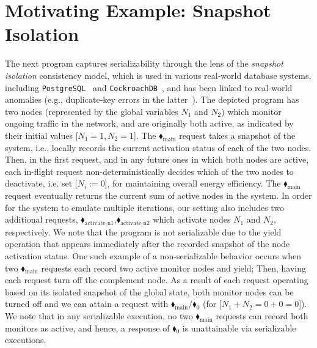 
\section{Motivating Example: Snapshot Isolation}
\label{appendix:snapshotIsolationExample}



The next program captures serializability through the lens of the \textit{snapshot isolation} consistency model, which is used in various real-world database systems, including \texttt{PostgreSQL}~\cite{postgresql-transaction-iso} and \texttt{CockroachDB}~\cite{cockroachdb-si-docs}, and has been linked to real‐world anomalies (e.g., duplicate‐key errors in the latter~\cite{cockroach-issue-14099}).
%
The depicted program has two nodes (represented by the global variables $N_1$ and $N_2$) which monitor ongoing traffic in the network, and are originally both active, as indicated by their initial values [$N_1=1,N_2=1$].
%
The {\color{ForestGreen}$\blacklozenge_\text{main}$} request takes a snapshot of the system, i.e., locally records the current activation status of each of the two nodes.
%
Then, in the first request, and in any future ones in which both nodes are active, each in-flight request non-deterministically decides which of the two nodes to deactivate, i.e. set [$N_i:=0$], for maintaining overall energy efficiency.
%
The {\color{ForestGreen}$\blacklozenge_\text{main}$} request eventually returns the current sum of active nodes in the system.
%
In order for the system to emulate multiple iterations, our setting also includes two additional requests, {\color{ForestGreen}$\blacklozenge_\text{activate\_n1}$},{\color{ForestGreen}$\blacklozenge_\text{activate\_n2}$} which activate nodes $N_1$ and $N_2$, respectively.
%
We note that the program is not serializable due to the yield operation that appears immediately after the recorded snapshot of the node activation status. One such example of a non-serializable behavior occurs when two {\color{ForestGreen}$\blacklozenge_\text{main}$} requests each record two active monitor nodes and yield; Then, having each request turn off the complement node. As a result of each request operating based on its isolated snapshot of the global state, both monitor nodes can be turned off and we can attain a request with {\color{ForestGreen}$\blacklozenge_\text{main}$}/{\color{red}$\blacklozenge_0$} (for [$N_1+N_2=0+0=0$]).
%
We note that in any serializable execution, no two {\color{ForestGreen}$\blacklozenge_\text{main}$} requests can record both monitors as active, and hence, a response of {\color{red}$\blacklozenge_0$} is unattainable via serializable executions.




